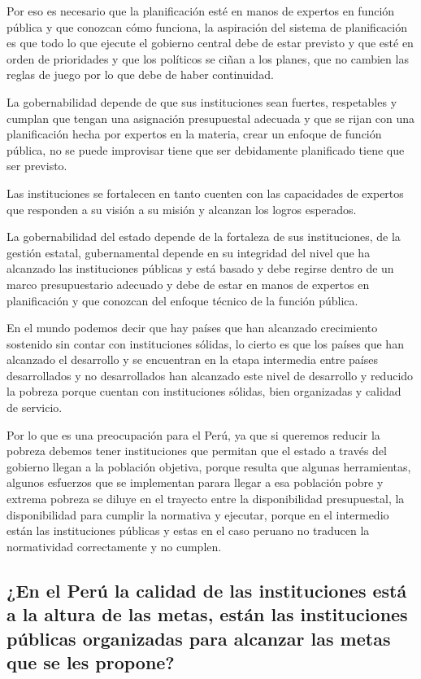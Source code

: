 \documentclass[
  letterpaper,
  DIV=11,
  numbers=noendperiod]{scrartcl}
\begin{document}
Por eso es necesario que la planificación esté en manos de expertos en
función pública y que conozcan cómo funciona, la aspiración del sistema
de planificación es que todo lo que ejecute el gobierno central debe de
estar previsto y que esté en orden de prioridades y que los políticos se
ciñan a los planes, que no cambien las reglas de juego por lo que debe
de haber continuidad.

La gobernabilidad depende de que sus instituciones sean fuertes,
respetables y cumplan que tengan una asignación presupuestal adecuada y
que se rijan con una planificación hecha por expertos en la materia,
crear un enfoque de función pública, no se puede improvisar tiene que
ser debidamente planificado tiene que ser previsto.

Las instituciones se fortalecen en tanto cuenten con las capacidades de
expertos que responden a su visión a su misión y alcanzan los logros
esperados.

La gobernabilidad del estado depende de la fortaleza de sus
instituciones, de la gestión estatal, gubernamental depende en su
integridad del nivel que ha alcanzado las instituciones públicas y está
basado y debe regirse dentro de un marco presupuestario adecuado y debe
de estar en manos de expertos en planificación y que conozcan del
enfoque técnico de la función pública.

En el mundo podemos decir que hay países que han alcanzado crecimiento
sostenido sin contar con instituciones sólidas, lo cierto es que los
países que han alcanzado el desarrollo y se encuentran en la etapa
intermedia entre países desarrollados y no desarrollados han alcanzado
este nivel de desarrollo y reducido la pobreza porque cuentan con
instituciones sólidas, bien organizadas y calidad de servicio.

Por lo que es una preocupación para el Perú, ya que si queremos reducir
la pobreza debemos tener instituciones que permitan que el estado a
través del gobierno llegan a la población objetiva, porque resulta que
algunas herramientas, algunos esfuerzos que se implementan parara llegar
a esa población pobre y extrema pobreza se diluye en el trayecto entre
la disponibilidad presupuestal, la disponibilidad para cumplir la
normativa y ejecutar, porque en el intermedio están las instituciones
públicas y estas en el caso peruano no traducen la normatividad
correctamente y no cumplen.

\hypertarget{en-el-peruxfa-la-calidad-de-las-instituciones-estuxe1-a-la-altura-de-las-metas-estuxe1n-las-instituciones-puxfablicas-organizadas-para-alcanzar-las-metas-que-se-les-propone}{%
\subsection{¿En el Perú la calidad de las instituciones está a la altura
de las metas, están las instituciones públicas organizadas para alcanzar
las metas que se les
propone?}\label{en-el-peruxfa-la-calidad-de-las-instituciones-estuxe1-a-la-altura-de-las-metas-estuxe1n-las-instituciones-puxfablicas-organizadas-para-alcanzar-las-metas-que-se-les-propone}}
\end{document}
